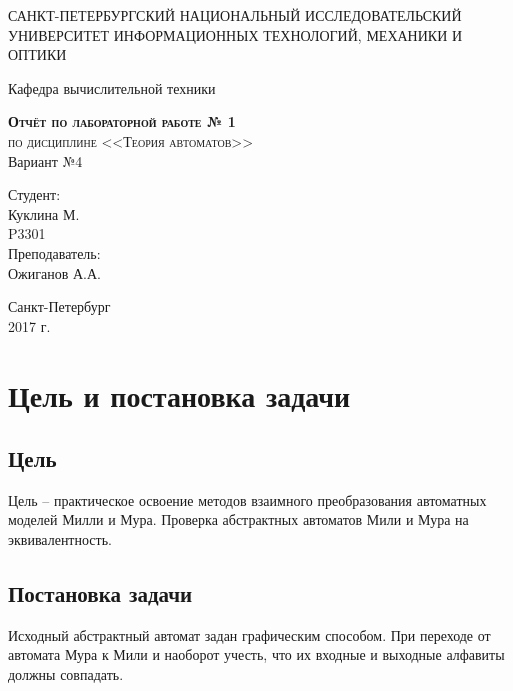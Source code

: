 \documentclass[a4paper,10pt]{article}
\begin{document}
    \begin{titlepage}
        \begin{center}
            \large
            САНКТ-ПЕТЕРБУРГСКИЙ НАЦИОНАЛЬНЫЙ ИССЛЕДОВАТЕЛЬСКИЙ УНИВЕРСИТЕТ ИНФОРМАЦИОННЫХ ТЕХНОЛОГИЙ, МЕХАНИКИ И ОПТИКИ \\


            \vspace{3cm}


            Кафедра вычислительной техники
            \vspace{4cm}

            \textsc{ \textbf{Отчёт по лабораторной работе  № 1} \\
            по дисциплине <<Теория автоматов>>\\}
            Вариант №4\\[8mm]

            \bigskip
        \end{center}
        \vspace{3cm}

        \hfill\begin{flushright}
             Студент: \\ Куклина М. \\ P3301 \\ 
             \vfill
             Преподаватель:\\ Ожиганов А.А.
        \end{flushright}
        \vfill
        \vfill
        \vfill
        \vfill
        \vfill
        \begin{center}
            Санкт-Петербург \\2017 г.
        \end{center}
    \end{titlepage}
\newpage

\section*{Цель и постановка задачи}
    \subsection*{Цель}
        Цель -- практическое освоение методов взаимного преобразования автоматных
        моделей Милли и Мура. Проверка абстрактных автоматов Мили и Мура на эквивалентность.
    \subsection*{Постановка задачи}
        Исходный абстрактный автомат задан графическим способом. При переходе
        от автомата Мура к Мили и наоборот учесть, что их входные и выходные алфавиты
        должны совпадать.
\end{document}
